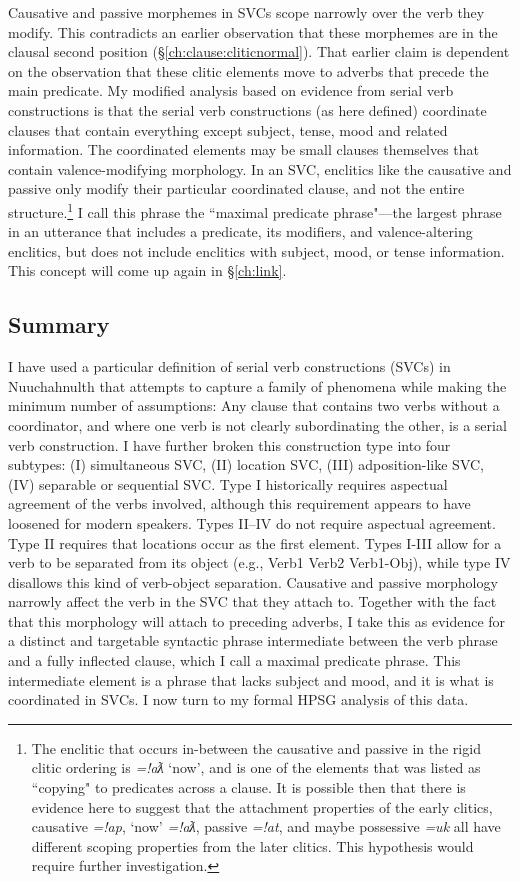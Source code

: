 Causative and passive morphemes in SVCs scope narrowly over the verb they modify. This contradicts an earlier observation that these morphemes are in the clausal second position (\S\ref{ch:clause:cliticnormal}). That earlier claim is dependent on the observation that these clitic elements move to adverbs that precede the main predicate. My modified analysis based on evidence from serial verb constructions is that the serial verb constructions (as here defined) coordinate clauses that contain everything except subject, tense, mood and related information. The coordinated elements may be small clauses themselves that contain valence-modifying morphology. In an SVC, enclitics like the causative and passive only modify their particular coordinated clause, and not the entire structure.\footnote{The enclitic that occurs in-between the causative and passive in the rigid clitic ordering is \textit{=!aƛ} `now', and is one of the elements that was listed as ``copying" to predicates across a clause. It is possible then that there is evidence here to suggest that the attachment properties of the early clitics, causative \textit{=!ap}, `now' \textit{=!aƛ}, passive \textit{=!at}, and maybe possessive \textit{=uk} all have different scoping properties from the later clitics. This hypothesis would require further investigation.} I call this phrase the ``maximal predicate phrase"---the largest phrase in an utterance that includes a predicate, its modifiers, and valence-altering enclitics, but does not include enclitics with subject, mood, or tense information. This concept will come up again in \S\ref{ch:link}.

\subsection{Summary}

I have used a particular definition of serial verb constructions (SVCs) in Nuuchahnulth that attempts to capture a family of phenomena while making the minimum number of assumptions: Any clause that contains two verbs without a coordinator, and where one verb is not clearly subordinating the other, is a serial verb construction. I have further broken this construction type into four subtypes: (I) simultaneous SVC, (II) location SVC, (III) adposition-like SVC, (IV) separable or sequential SVC. Type I historically requires aspectual agreement of the verbs involved, although this requirement appears to have loosened for modern speakers. Types II--IV do not require aspectual agreement. Type II requires that locations occur as the first element. Types I-III allow for a verb to be separated from its object (e.g., Verb1 Verb2 Verb1-Obj), while type IV disallows this kind of verb-object separation. Causative and passive morphology narrowly affect the verb in the SVC that they attach to. Together with the fact that this morphology will attach to preceding adverbs, I take this as evidence for a distinct and targetable syntactic phrase intermediate between the verb phrase and a fully inflected clause, which I call a maximal predicate phrase. This intermediate element is a phrase that lacks subject and mood, and it is what is coordinated in SVCs. I now turn to my formal HPSG analysis of this data.

